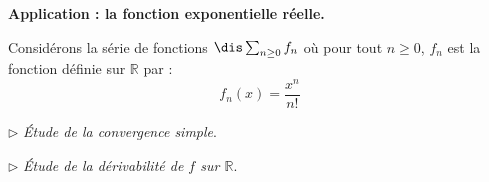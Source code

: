 \documentclass[a4paper,10pt]{report}
\begin{document}
\newpage

\noindent \textbf{Application : la fonction exponentielle réelle.}

\medskip

\noindent Considérons la série de fonctions $\dis \sum_{n \geq 0}f_n$ où pour tout $n \geq 0$, $f_n$ est la fonction définie sur $\mathbb{R}$ par :
$$ f_n (x) = \frac{x^n}{n!}$$

\medskip

\noindent $\rhd$ \textit{Étude de la convergence simple}. 

%

\vspace{6cm}

\medskip

\noindent $\rhd$ \textit{Étude de la dérivabilité de $f$ sur $\mathbb{R}$}. 

%
%
%
\end{document}
